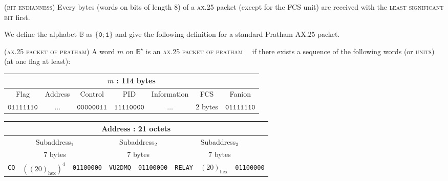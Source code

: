 \documentclass[a4paper]{report}
\newenvironment{definition}[1][Definition.]{\begin{trivlist}
\item[\hskip \labelsep {\bfseries #1}]}{\end{trivlist}}
\newenvironment{remark}[1][Remark.]{\begin{trivlist}
\item[\hskip \labelsep {\bfseries #1}]}{\end{trivlist}}
\begin{document}
\begin{remark}
  (\textsc{bit endianness})
  Every bytes (words on bits of length $8$) of a \textsc{ax.25} packet (except for the FCS unit) are received with the \textsc{least significant bit} first\cite{IITB}.
\end{remark}

We define the alphabet $\mathbb{B}$ as $\{\texttt{0} ; \texttt{1}\}$ and give the following definition for a standard Pratham AX.25 packet.

\begin{definition}
  \textsc{(ax.25 packet of pratham)}
  A word $m$ on $\mathbb{B}^{\star}$ is an \textsc{ax.25 packet of pratham}~\cite{IITB}~\cite{ax25} if there exists a sequence of the following words (or \textsc{units}) (at one flag at least):

\begin{center}
  \begin{footnotesize}
    \begin{tabular}{|c|c|c|c|c|c|c|}
      \hline
      \multicolumn{7}{|c|}{$m$ : 114 bytes}\\
      \hline
      Flag & Address & Control & PID & {\tiny Information} & FCS & Fanion\\
      \hline
      $\texttt{01111110}$ & $\dots$ & $\texttt{00000011}$ & $\texttt{11110000}$ & $\dots$ & $2$ bytes & $\texttt{01111110}$\\
      \hline
    \end{tabular}
  \end{footnotesize}
\end{center}


\begin{center}
  \begin{footnotesize}
    \begin{tabular}{|c|c|c|c|c|c|c|c|}
      \hline
      \multicolumn{8}{|c|}{Address : 21 octets}\\
      \hline
      \multicolumn{3}{|c|}{Subaddress$_1$} & \multicolumn{2}{c|}{Subaddress$_2$} & \multicolumn{3}{c|}{Subaddress$_3$}\\
      \hline
      \multicolumn{3}{|c|}{7 bytes} & \multicolumn{2}{c|}{7 bytes} & \multicolumn{3}{c|}{7 bytes}\\
      \hline
      \texttt{CQ} & $\left ( (20)_{\operatorname{hex}} \right )^4$ & \texttt{01100000} & \texttt{VU2DMQ} & \texttt{01100000} & \texttt{RELAY} & $(20)_{\operatorname{hex}}$ & \texttt{01100000}\\
      \hline
    \end{tabular}
  \end{footnotesize}
\end{center}


\end{definition}
\end{document}
